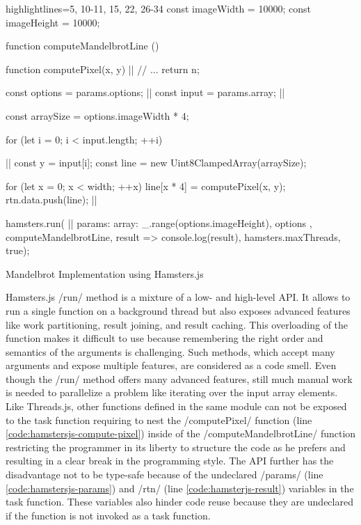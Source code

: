 \begin{listing}
\begin{javascriptcode*}{highlightlines={5, 10-11, 15, 22, 26-34}}
const imageWidth = 10000;
const imageHeight = 10000;

function computeMandelbrotLine () {
	function computePixel(x, y) {|$\label{code:hamstersjs-compute-pixel}$|
		// ...
		return n;
	}

	const options = params.options; |$\label{code:hamstersjs-params}$|
	const input = params.array; |$\label{code:hamstersjs-params-two}$|

	const arraySize = options.imageWidth * 4;

	for (let i = 0; i < input.length; ++i) {|$\label{code:hamsterjs-iterate}$|
		const y = input[i];
		const line = new Uint8ClampedArray(arraySize);
		
		for (let x = 0; x < width; ++x) {
			line[x * 4] = computePixel(x, y);
		}
		rtn.data.push(line); |$\label{code:hamsterjs-result}$|
	}
}

hamsters.run( |$\label{code:hamsterjs-start}$|
	params: {
		array: _.range(options.imageHeight),
		options
	},  
	computeMandelbrotLine, 
	result => console.log(result), 
	hamsters.maxThreads, 
	true);
\end{javascriptcode*}
\caption{Mandelbrot Implementation using Hamsters.js}
\label{fig:mandelbrot-hamsterjs}
\end{listing}

Hamsters.js \javascriptinline/run/ method is a mixture of a low- and high-level API. It allows to run a single function on a background thread but also exposes advanced features like work partitioning, result joining, and result caching. This overloading of the function makes it difficult to use because remembering the right order and semantics of the arguments is challenging. Such methods, which accept many arguments and expose multiple features, are considered as a code smell. Even though the \javascriptinline/run/ method offers many advanced features, still much manual work is needed to parallelize a problem like iterating over the input array elements. Like Threads.js, other functions defined in the same module can not be exposed to the task function requiring to nest the \javascriptinline/computePixel/ function (line \ref{code:hamstersjs-compute-pixel}) inside of the \javascriptinline/computeMandelbrotLine/ function restricting the programmer in its liberty to structure the code as he prefers and resulting in a clear break in the programming style. The API further has the disadvantage not to be type-safe because of the undeclared \javascriptinline/params/ (line \ref{code:hamstersjs-params}) and \javascriptinline/rtn/ (line \ref{code:hamsterjs-result}) variables in the task function. These variables also hinder code reuse because they are undeclared if the function is not invoked as a task function.

